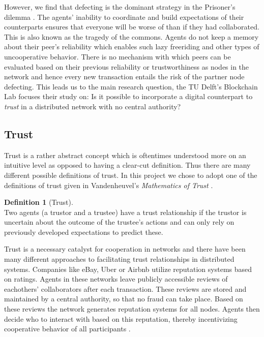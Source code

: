 \documentclass[sigconf]{acmart}
\theoremstyle{definition}
\newtheorem{definition}{Definition}[section]
\begin{document}
\noindent However, we find that defecting is the dominant strategy in the Prisoner's dilemma \citep{An optimal strategy to solve the 
Prisoner's Dilemma}. The agents' inability to coordinate and build expectations of their counterparts ensures that everyone will be worse of than if they had collaborated. This is also known as the tragedy of the commons. Agents do not keep a memory about their peer's reliability which enables such lazy freeriding and other types of uncooperative behavior. There is no mechanism with which peers can be evaluated based on their previous reliability or trustworthiness as nodes in the network and hence every new transaction entails the risk of the partner node defecting. This leads us to the main research question, the TU Delft's Blockchain Lab focuses their study on: Is it possible to incorporate a digital counterpart to \textit{trust} in a distributed network with no central authority?

\subsection{Trust}
\label{subsec:Trust}
Trust is a rather abstract concept which is oftentimes understood more on an intuitive level as opposed to having a clear-cut definition. Thus there are many different possible definitions of trust. In this project we chose to adopt one of the definitions of trust given in Vandenheuvel's {\it Mathematics of Trust} \citep{Mathematics of Trust}.\\

\begin{definition}[Trust]\ \\
Two agents (a trustor and a trustee) have a trust relationship if the trustor is uncertain about the outcome of the trustee's actions and can only rely on previously developed expectations to predict these.
\end{definition}

\noindent Trust is a necessary catalyst for cooperation in networks and there have been many different approaches to facilitating trust relationships in distributed systems. Companies like eBay, Uber or Airbnb utilize reputation systems based on ratings. Agents in these networks leave publicly accessible reviews of eachothers' collaborators after each transaction. These reviews are stored and maintained by a central authority, so that no fraud can take place. Based on these reviews the network generates reputation systems for all nodes. Agents then decide who to interact with based on this reputation, thereby incentivizing cooperative behavior of all participants \citep{Reputation Systems}. \vspace{1em}\\
\end{document}
